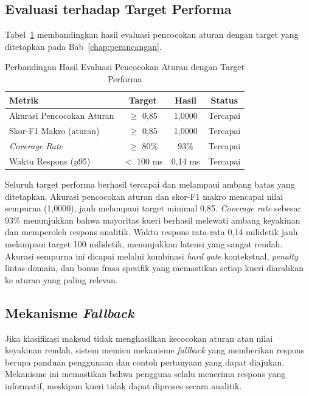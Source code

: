 \subsection{Evaluasi terhadap Target Performa}

Tabel~\ref{tab:eval-intent-vs-target} membandingkan hasil evaluasi pencocokan aturan dengan target yang ditetapkan pada Bab~\ref{chap:perancangan}.

\begin{table}[htbp]
\centering
\caption{Perbandingan Hasil Evaluasi Pencocokan Aturan dengan Target Performa}
\label{tab:eval-intent-vs-target}
\begin{tabular}{|p{5cm}|c|c|c|}
\hline
\textbf{Metrik} & \textbf{Target} & \textbf{Hasil} & \textbf{Status} \\
\hline
Akurasi Pencocokan Aturan & $\geq$ 0{,}85 & 1{,}0000 & Tercapai \\
\hline
Skor-F1 Makro (aturan) & $\geq$ 0{,}85 & 1{,}0000 & Tercapai \\
\hline
\textit{Coverage Rate} & $\geq$ 80\% & 93\% & Tercapai \\
\hline
Waktu Respons (p95) & $<$ 100 ms & 0{,}14 ms & Tercapai \\
\hline
\end{tabular}
\end{table}

Seluruh target performa berhasil tercapai dan melampaui ambang batas yang ditetapkan. Akurasi pencocokan aturan dan skor-F1 makro mencapai nilai sempurna (1{,}0000), jauh melampaui target minimal 0{,}85. \textit{Coverage rate} sebesar 93\% menunjukkan bahwa mayoritas kueri berhasil melewati ambang keyakinan dan memperoleh respons analitik. Waktu respons rata-rata 0{,}14 milidetik jauh melampaui target 100 milidetik, menunjukkan latensi yang sangat rendah. Akurasi sempurna ini dicapai melalui kombinasi \textit{hard gate} kontekstual, \textit{penalty} lintas-domain, dan bonus frasa spesifik yang memastikan setiap kueri diarahkan ke aturan yang paling relevan.

\subsection{Mekanisme \textit{Fallback}}

Jika klasifikasi maksud tidak menghasilkan kecocokan aturan atau nilai keyakinan rendah, sistem memicu mekanisme \textit{fallback} yang memberikan respons berupa panduan penggunaan dan contoh pertanyaan yang dapat diajukan. Mekanisme ini memastikan bahwa pengguna selalu menerima respons yang informatif, meskipun kueri tidak dapat diproses secara analitik.


